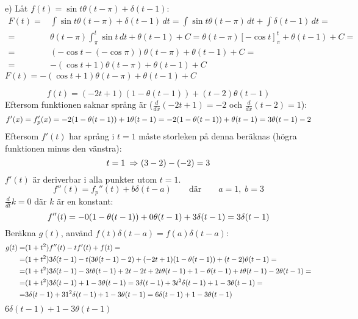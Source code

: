 \begin{task}{e)}
	Låt $f(t)=\sin t\theta(t-\pi)+\delta(t-1)$:
	\begin{align*}
	F(t)=
	&\int \! \sin t\theta(t-\pi)+\delta(t-1) \, dt=
	\int \! \sin t\theta(t-\pi) \, dt + \int \! \delta(t-1) \, dt= \\ =
	&\theta(t-\pi)\int_{\pi}^{t} \! \sin t \, dt+\theta(t-1)+C=
	\theta(t-\pi)\left[-\cos t\right]_{\pi}^{t}+\theta(t-1)+C= \\ =
	&\left(-\cos t-(-\cos \pi)\right)\theta(t-\pi)+\theta(t-1)+C= \\ =
	&-\left(\cos t+1\right)\theta(t-\pi)+\theta(t-1)+C
	\end{align*}
	\ans $F(t)=-\left(\cos t+1\right)\theta(t-\pi)+\theta(t-1)+C$
\end{task}

\pagebreak
\begin{task}{2.15}
	\[f(t)=(-2t+1)(1-\theta(t-1))+(t-2)\theta(t-1)\]
	Eftersom funktionen saknar språng är ($\frac{d}{dx}(-2t+1)= -2$ och $\frac{d}{dx}(t-2)= 1$):
	\[f'(x)=f_p'(x) = -2(1-\theta(t-1))+1\*\theta(t-1) = -2(1-\theta(t-1))+\theta(t-1)=3\theta(t-1)-2\]
	Eftersom $f'(t)$ har språng i $t=1$ måste storleken på denna beräknas (högra funktionen minus den vänstra):
	\[t=1 \ra (3-2)-(-2)=3\]
	$f'(t)$ är deriverbar i alla punkter utom $t=1$.
	\[f''(t)=f_p''(t)+b\delta(t-a)\qquad\text{där}\qquad a=1,\;b=3\]
	$\frac{d}{dt}k=0$ där $k$ är en konstant:
	\[f''(t) = -0\*(1-\theta(t-1))+0\*\theta(t-1)+3\delta(t-1)=3\delta(t-1)\]
	Beräkna $g(t)$, använd $f(t)\delta(t-a)=f(a)\delta(t-a)$:
	\begin{align*}
	g(t)=
	&(1+t^2)f''(t)-tf'(t)+f(t)= \\ =
	&(1+t^2)3\delta(t-1)-t(3\theta(t-1)-2)+(-2t+1)(1-\theta(t-1))+(t-2)\theta(t-1)= \\ =
	&(1+t^2)3\delta(t-1)-3t\theta(t-1)+2t-2t+2t\theta(t-1)+1-\theta(t-1)+t\theta(t-1)-2\theta(t-1)= \\ =
	&(1+t^2)3\delta(t-1)+1-3\theta(t-1)=
	3\delta(t-1)+3t^2\delta(t-1)+1-3\theta(t-1)= \\ =
	&3\delta(t-1)+3\*1^2\delta(t-1)+1-3\theta(t-1)=
	6\delta(t-1)+1-3\theta(t-1)
	\end{align*}
	\ans $6\delta(t-1)+1-3\theta(t-1)$
\end{task}

\begin{task}{2.16}
\end{task}

\begin{task}{2.17}
\end{task}